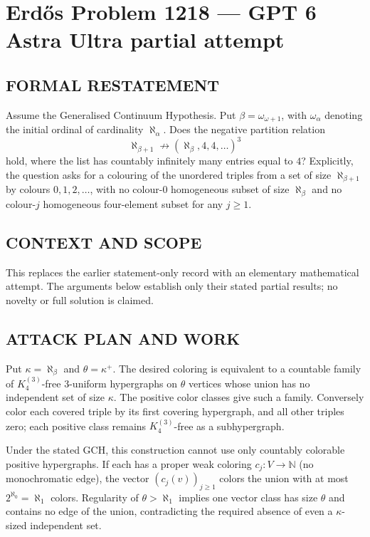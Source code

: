\section*{Erd\H{o}s Problem 1218 --- GPT 6 Astra Ultra partial attempt}


\subsection*{FORMAL RESTATEMENT}
Assume the Generalised Continuum Hypothesis. Put $\beta=\omega_{\omega+1}$, with $\omega_\alpha$ denoting the initial ordinal of cardinality $\aleph_\alpha$. Does the negative partition relation
\[\aleph_{\beta+1}\not\longrightarrow(\aleph_\beta,4,4,\ldots)^3\]
hold, where the list has countably infinitely many entries equal to $4$? Explicitly, the question asks for a colouring of the unordered triples from a set of size $\aleph_{\beta+1}$ by colours $0,1,2,\ldots$, with no colour-$0$ homogeneous subset of size $\aleph_\beta$ and no colour-$j$ homogeneous four-element subset for any $j\geq1$.

\subsection*{CONTEXT AND SCOPE}
This replaces the earlier statement-only record with an elementary mathematical attempt. The arguments below establish only their stated partial results; no novelty or full solution is claimed.

\subsection*{ATTACK PLAN AND WORK}
Put $\kappa=\aleph_\beta$ and $\theta=\kappa^+$. The desired coloring is
equivalent to a countable family of $K_4^{(3)}$-free 3-uniform hypergraphs on
$\theta$ vertices whose union has no independent set of size $\kappa$.
The positive color classes give such a family. Conversely color each covered
triple by its first covering hypergraph, and all other triples zero; each
positive class remains $K_4^{(3)}$-free as a subhypergraph.

Under the stated GCH, this construction cannot use only countably colorable
positive hypergraphs. If each has a proper weak coloring $c_j:V\to\mathbb N$
(no monochromatic edge), the vector $(c_j(v))_{j\ge1}$ colors the union with
at most $2^{\aleph_0}=\aleph_1$ colors. Regularity of $\theta>\aleph_1$ implies
one vector class has size $\theta$ and contains no edge of the union, contradicting
the required absence of even a $\kappa$-sized independent set.

